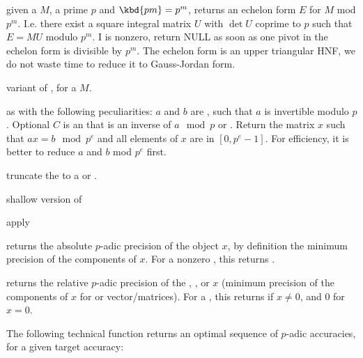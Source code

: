 



 given a
 $M$, a prime $p$ and $\kbd{pm} = p^m$, returns an echelon form
$E$ for $M$ mod $p^m$. I.e. there exist a square integral matrix $U$ with
$\det U$ coprime to $p$ such that $E = MU$ modulo $p^m$. I
 is nonzero, return NULL as soon as one pivot in
the echelon form is divisible by $p^m$. The echelon form is an upper
triangular HNF, we do not waste time to reduce it to Gauss-Jordan form.

variant of , for a  $M$.

 as 
with the following peculiarities: $a$ and $b$ are , such that $a$ is
invertible modulo $p$. Optional $C$ is an  that is an inverse of
$a\mod p$ or . Return the matrix $x$ such that $ax=b\mod p^e$ and
all elements of $x$ are in $[0,p^e-1]$. For efficiency, it is better
to reduce $a$ and $b$ mod $p^e$ first.

 truncate the  to a  or
.

 shallow version of 

 apply 

 returns the absolute $p$-adic precision of
the object $x$, by definition the minimum precision of the components of $x$.
For a nonzero , this returns .

 returns the relative $p$-adic
precision of the , , or  $x$ (minimum precision
of the components of $x$ for  or vector/matrices).
For a , this returns  if $x\neq0$, and $0$ for $x=0$.


The following technical function returns an optimal sequence of $p$-adic
accuracies, for a given target accuracy:

